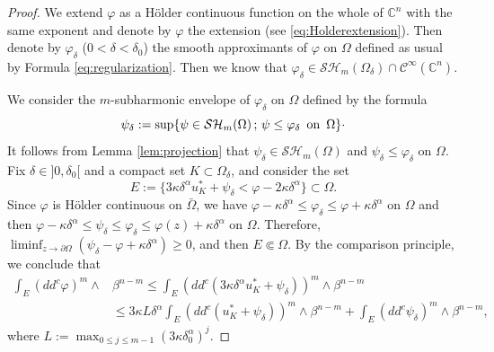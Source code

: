 \documentclass[11pt]{article}
\providecommand{\C}{}
\numberwithin{equation}{section}
\newcommand{\sep}{\,;\,}
\theoremstyle{definition}
\renewcommand{\C}{\mathbb{C}}
\newcommand{\Cc}{\mathcal{C}}
\theoremstyle{plain}
\theoremstyle{definition}
\begin{document}
\begin{proof}
We extend $\varphi$ as a Hölder continuous function on the whole of $\C^n$ with the same exponent and denote by $\varphi$ the extension (see \eqref{eq:Holderextension}).
Then denote by $\varphi_{\delta}$ ($0 < \delta < \delta_0$) the smooth approximants of $\varphi $ on $\Omega$ defined as usual by Formula \eqref{eq:regularization}. Then we know that $\varphi_\delta \in \mathcal{SH}_m (\Omega_{\delta})\cap\Cc^{\infty}(\C^n)$.

We consider the $m$-subharmonic envelope of $\varphi_\delta$ on $\Omega$ defined by the formula
\[
\psi_\delta:= \sup \{\psi \in \mathcal{SH}_m (\Omega) \sep \psi \leq \varphi_\delta \, \, \, \hbox{on} \, \, \, \Omega \}\cdot
\]
It follows from Lemma \ref{lem:projection} that $\psi_\delta \in \mathcal{SH}_m (\Omega)$ and $\psi_\delta \leq \varphi_\delta $ on $\Omega$. Fix $\delta \in{}]0, \delta _0[$ and a compact set $K \subset \Omega_\delta$, and consider the set
\[
E:=\{3 \kappa \delta^\alpha u_K^*+ \psi_\delta<\varphi- 2 \kappa \delta^{\alpha}\} \subset \Omega.
\]
Since $\varphi $ is Hölder continuous on $\bar \Omega$, we have $\varphi - \kappa \delta^\alpha\leq \varphi_{\delta} \leq \varphi + \kappa \delta^{\alpha}$ on $\Omega$ and then $\varphi - \kappa \delta^\alpha \leq \psi_\delta \leq \varphi_{\delta} \leq \varphi (z) + \kappa \delta^\alpha$ on $\Omega$.
Therefore, $\liminf_{z \to \partial \Omega} (\psi_\delta - \varphi + \kappa \delta^\alpha ) \geq 0$, and then $E \Subset \Omega$. By the comparison principle, we conclude that
\begin{equation}\label{eq:fundmentalestimate}
\begin{split}
\int_{E}(dd^c\varphi)^m\wedge&\beta^{n-m} \leq \int_{E}(dd^c(3 \kappa \delta^\alpha u_K^* + \psi_{\delta}))^m\wedge\beta^{n-m} \\
& \leq 3 \kappa L \delta^\alpha \int_{E}(dd^c(u_K^* + \psi_{\delta}))^m\wedge\beta^{n-m}+\int_{E}(dd^c\psi_{\delta})^m\wedge\beta^{n-m},
\end{split}
\end{equation}
where $L:= \max_{0 \leq j \leq m - 1} (3 \kappa \delta_0^\alpha)^j$.


\end{proof}
\end{document}
